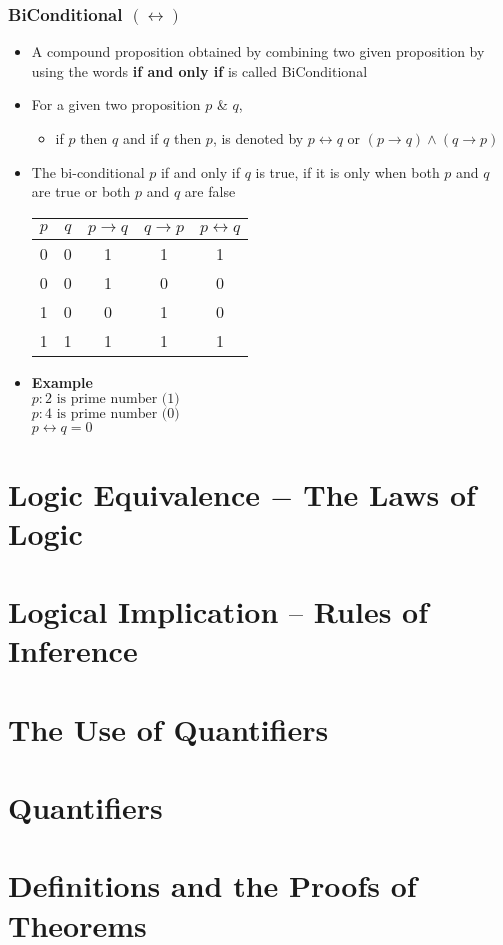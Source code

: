 \documentclass{article}
\begin{document}
	\subsubsection{BiConditional $(\leftrightarrow)$}
	\begin{itemize}
		\item A compound proposition obtained by combining two given proposition by using the words
			\textbf{if and only if} is called BiConditional
		\item For a given two proposition $p$ \& $q$,
			\begin{itemize}
				\item if $p$ then $q$ and if $q$ then $p$, is denoted by $p\leftrightarrow q$
					or $(p\to q)\land(q\to p)$
			\end{itemize}
		\item The bi-conditional $p$ if and only if $q$ is true, if it is only when both $p$ and $q$
			are true or both $p$ and $q$ are false
			\begin{center}
				\begin{tabular}{|c|c|c|c|c|} \hline
					$p$ & $q$ & $p\to q$ & $q\to p$ & $p\leftrightarrow q$ \\ \hline
					0 & 0 & 1 & 1 & 1 \\
					0 & 0 & 1 & 0 & 0 \\
					1 & 0 & 0 & 1 & 0 \\
					1 & 1 & 1 & 1 & 1 \\ \hline
				\end{tabular}
			\end{center}
		\item [] \textbf{Example} \\
			$p : \text{2 is prime number (1)}$ \\
			$p : \text{4 is prime number (0)}$ \\
			$p\leftrightarrow q=0$
	\end{itemize}

	\section{Logic Equivalence $-$ The Laws of Logic}

	\section{Logical Implication $–$ Rules of Inference}

	\section{The Use of Quantifiers}
	\section{Quantifiers}
	\section{Definitions and the Proofs of Theorems}
\end{document}
